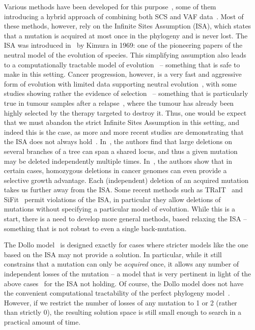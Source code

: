 \documentclass[a4paper,USenglish]{article}
\theoremstyle{definition}
\begin{document}
Various methods have been developed for this purpose~\cite{Jahn2016,Ross2016, Zafar2017}, some of them introducing a hybrid approach of combining both SCS and VAF data~\cite{Ramazzotti132183, Malikic234914, Salehi2017}.  Most of these methods, however, rely on the Infinite Sites Assumption (ISA), which states that a mutation is acquired at most once in the phylogeny and is never lost. The ISA was introduced in~\cite{Kimura1969} by Kimura in 1969: one of the pioneering papers of the neutral model of the evolution of species. This simplifying assumption also leads to a computationally tractable model of evolution~\cite{gusfield1991} -- something that is safe to make in this setting. Cancer progression, however, is a very fast and aggressive form of evolution with limited data supporting neutral evolution~\cite{DAVIS2017151}, with some studies showing rather the evidence of selection~\cite{Bignell2010,DAVIS2017151} -- something that is particularly true in tumour samples after a relapse~\cite{Ding2012,Gillies2012,DAVIS2017151}, where the tumour has already been highly selected by the therapy targeted to destroy it.
Thus, one would be expect that we must abandon the strict Infinite Sites Assumption in this setting, and indeed this is the case, as more and more recent studies are demonstrating that the ISA does not always hold~\cite{Kuipers13102017,Brown2017,Bignell2010}. In~\cite{Brown2017}, the authors find that large deletions on several branches of a tree can span a shared locus, and
thus a given mutation may be deleted independently multiple times.  In~\cite{Bignell2010}, the authors show that in certain cases, homozygous deletions in cancer genomes can even provide a selective growth advantage. Each (independent) deletion of an acquired mutation takes us further away from the ISA. Some recent methods such as TRaIT~\cite{Ramazzotti132183} and SiFit~\cite{Zafar2017}  permit violations of the ISA, in particular they allow deletions of mutations without specifying a particular model of evolution.  While this is a start, there is a need to develop more general methods, based relaxing the ISA -- something that is not robust to even a single back-mutation.

The Dollo model~\cite{Rogozin2006} is designed exactly for cases where stricter models like the one based on the ISA may not provide a solution.  In particular, while it still constrains that a mutation can only be \textit{acquired} once, it allows any number of independent losses of the mutation -- a model that is very pertinent in light of the above cases~\cite{Kuipers13102017,Brown2017,Bignell2010} for the ISA not holding. Of course, the Dollo model does not have the convenient computational tractability of the perfect phylogeny model~\cite{gusfield1991}. However, if we restrict the number of losses of any mutation to 1 or 2 (rather than strictly 0), the resulting solution space is still small enough to search in a practical amount of time.
\end{document}
